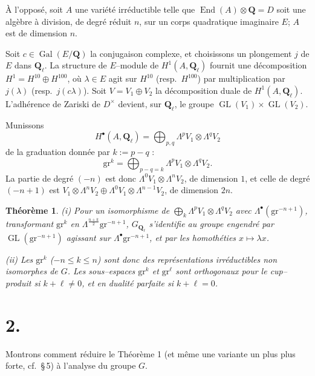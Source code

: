 \documentclass[11pt,a4paper]{article}
\theoremstyle{plain}
\newtheorem{theorem}{Th\'eor\`eme}
\theoremstyle{definition}
\DeclareMathOperator{\Gal}{Gal}
\DeclareMathOperator{\End}{End}
\DeclareMathOperator{\GL}{GL}
\begin{document}
\`A l'oppos\'e, soit $A$ une vari\'et\'e irr\'eductible telle que $\End(A) \otimes \mathbf{Q} = D$ soit une alg\`ebre \`a division, de degr\'e r\'eduit $n$, sur un corps quadratique imaginaire $E$; $A$ est de dimension $n$.

Soit $c \in \Gal(E/\mathbf{Q})$ la conjugaison complexe, et choisissons un plongement $j$ de $E$ dans $\mathbf{Q}_\ell$. La structure de $E$--module de $H^1(A, \mathbf{Q}_\ell)$ fournit une d\'ecomposition $H^1 = H^{10} \oplus H^{100}$, o\`u $\lambda \in E$ agit sur $H^{10}$ (resp.\ $H^{100}$) par multiplication par $j(\lambda)$ (resp.\ $j(c\lambda)$). Soit $V = V_1 \oplus V_2$ la d\'ecomposition duale de $H^1(A, \mathbf{Q}_\ell)$. L'adh\'erence de Zariski de $D^\times$ devient, sur $\mathbf{Q}_\ell$, le groupe $\GL(V_1) \times \GL(V_2)$.

Munissons
\[
H^\bullet(A, \mathbf{Q}_\ell) = \bigoplus_{p,q} \Lambda^p V_1 \otimes \Lambda^q V_2
\]
de la graduation donn\'ee par $k := p - q$ :
\begin{equation}\label{eq:grad}
\mathrm{gr}^k = \bigoplus_{p-q=k} \Lambda^p V_1 \otimes \Lambda^q V_2 .
\end{equation}
La partie de degr\'e $(-n)$ est donc $\Lambda^0 V_1 \otimes \Lambda^n V_2$, de dimension $1$, et celle de degr\'e $(-n+1)$ est $V_1 \otimes \Lambda^n V_2 \oplus \Lambda^0 V_1 \otimes \Lambda^{n-1} V_2$, de dimension $2n$.

\begin{theorem}\label{thm:3}
\emph{(i)} Pour un isomorphisme de $\bigoplus_k \Lambda^p V_1 \otimes \Lambda^q V_2$ avec $\Lambda^\bullet(\mathrm{gr}^{-n+1})$, transformant $\mathrm{gr}^k$ en $\Lambda^{\frac{n+k}{2}} \mathrm{gr}^{-n+1}$, $G_{\mathbf{Q}_\ell}$ s'identifie au groupe engendr\'e par $\GL(\mathrm{gr}^{-n+1})$ agissant sur $\Lambda^\bullet \mathrm{gr}^{-n+1}$, et par les homoth\'eties $x \mapsto \lambda x$.

\emph{(ii)} Les $\mathrm{gr}^k$ ($-n \leq k \leq n$) sont donc des repr\'esentations irr\'eductibles non isomorphes de $G$. Les sous--espaces $\mathrm{gr}^k$ et $\mathrm{gr}^\ell$ sont orthogonaux pour le cup--produit si $k + \ell \neq 0$, et en dualit\'e parfaite si $k + \ell = 0$.
\end{theorem}

\section*{2.}

Montrons comment r\'eduire le Th\'eor\`eme 1 (et m\^eme une variante un plus plus forte, cf.\ \S\,5) \`a l'analyse du groupe $G$.
\end{document}
